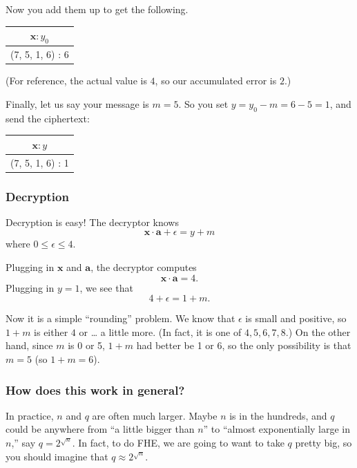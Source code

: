 Now you add them up to get the following.

\begin{center}
\begin{tabular}{|c|}
\hline
\(\mathbf{x}:y_{0}\) \\
\hline \hline
(7, 5, 1, 6) : 6 \\
\hline
\end{tabular}
\end{center}

(For reference, the actual value is \(4\), so our accumulated error is
\(2\).)

Finally, let us say your message is \(m = 5\). So you set
\(y = y_{0} - m = 6 - 5 = 1\), and send the ciphertext:

\begin{center}
\begin{tabular}{|c|}
\hline
\(\mathbf{x}:y\) \\
\hline \hline
(7, 5, 1, 6) : 1 \\
\hline
\end{tabular}
\end{center}

\subsubsection{Decryption}\label{decryption}

Decryption is easy! The decryptor knows
\[\mathbf{x} \cdot \mathbf{a} + \epsilon = y + m\] where
\(0 \leq \epsilon \leq 4\).

Plugging in \(\mathbf{x}\) and \(\mathbf{a}\), the decryptor computes
\[\mathbf{x} \cdot \mathbf{a} = 4.\] Plugging in \(y = 1\), we see that
\[4 + \epsilon = 1 + m.\]

Now it is a simple ``rounding'' problem. We know that \(\epsilon\) is
small and positive, so \(1 + m\) is either \(4\) or \ldots{} a little
more. (In fact, it is one of \(4,5,6,7,8\).) On the other hand, since
\(m\) is 0 or 5, \(1 + m\) had better be 1 or 6, so the only possibility
is that \(m = 5\) (so \(1 + m = 6\)).

\subsubsection{How does this work in
general?}\label{how-does-this-work-in-general}

In practice, \(n\) and \(q\) are often much larger. Maybe \(n\) is in
the hundreds, and \(q\) could be anywhere from ``a little bigger than
\(n\)'' to ``almost exponentially large in \(n\),'' say
\(q = 2^{\sqrt{n}}\). In fact, to do FHE, we are going to want to take
\(q\) pretty big, so you should imagine that \(q \approx 2^{\sqrt{n}}\).

